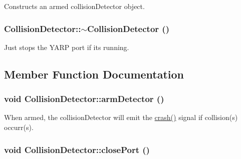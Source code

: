 Constructs an armed collisionDetector object. \hypertarget{class_collision_detector_a1a0f7a386920e0cf83a101be92f04598}{
\subsubsection[{$\sim$CollisionDetector}]{\setlength{\rightskip}{0pt plus 5cm}CollisionDetector::$\sim$CollisionDetector ()}}
\label{class_collision_detector_a1a0f7a386920e0cf83a101be92f04598}


Just stops the YARP port if its running. 

\subsection{Member Function Documentation}
\hypertarget{class_collision_detector_ad75885bcd649c22da007c91e91b17dfc}{
\subsubsection[{armDetector}]{\setlength{\rightskip}{0pt plus 5cm}void CollisionDetector::armDetector ()}}
\label{class_collision_detector_ad75885bcd649c22da007c91e91b17dfc}


When armed, the collisionDetector will emit the \hyperlink{class_collision_detector_a7a6c1a9b11907db7252b6544ee1ce8b4}{crash()} signal if collision(s) occurr(s). \hypertarget{class_collision_detector_a2a9b9c210d15989278ec9ff3e88b67c7}{
\subsubsection[{closePort}]{\setlength{\rightskip}{0pt plus 5cm}void CollisionDetector::closePort ()}}
\label{class_collision_detector_a2a9b9c210d15989278ec9ff3e88b67c7}



